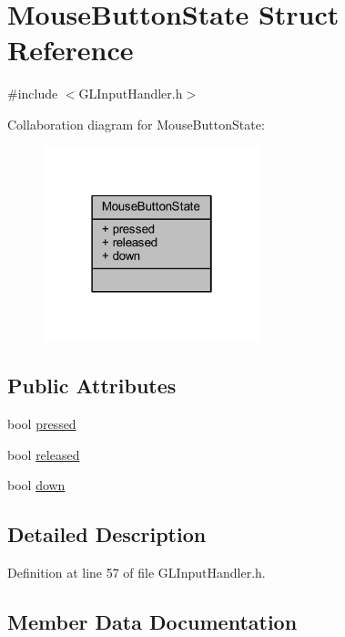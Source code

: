 \hypertarget{struct_mouse_button_state}{}\section{Mouse\+Button\+State Struct Reference}
\label{struct_mouse_button_state}


{\ttfamily \#include $<$G\+L\+Input\+Handler.\+h$>$}



Collaboration diagram for Mouse\+Button\+State\+:\nopagebreak
\begin{figure}[H]
\begin{center}
\leavevmode
\includegraphics[width=178pt]{struct_mouse_button_state__coll__graph}
\end{center}
\end{figure}
\subsection*{Public Attributes}
\begin{DoxyCompactItemize}
\item 
bool \hyperlink{struct_mouse_button_state_ae428b125228d89509b7cd0252de7afc8}{pressed}
\item 
bool \hyperlink{struct_mouse_button_state_a229af718ec1b3105452ecb237f35d502}{released}
\item 
bool \hyperlink{struct_mouse_button_state_a6aa2ac9258c9919903ace5772abd38d0}{down}
\end{DoxyCompactItemize}


\subsection{Detailed Description}


Definition at line 57 of file G\+L\+Input\+Handler.\+h.



\subsection{Member Data Documentation}
